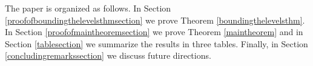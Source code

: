 The paper is organized as follows.  In Section \ref{proofofboundingthelevelsthmsection} we prove Theorem \ref{boundingthelevelsthm}.  In Section \ref{proofofmaintheoremsection} we prove Theorem \ref{maintheorem} and in Section \ref{tablesection} we summarize the results in three tables.  Finally, in Section \ref{concludingremarkssection} we discuss future directions.